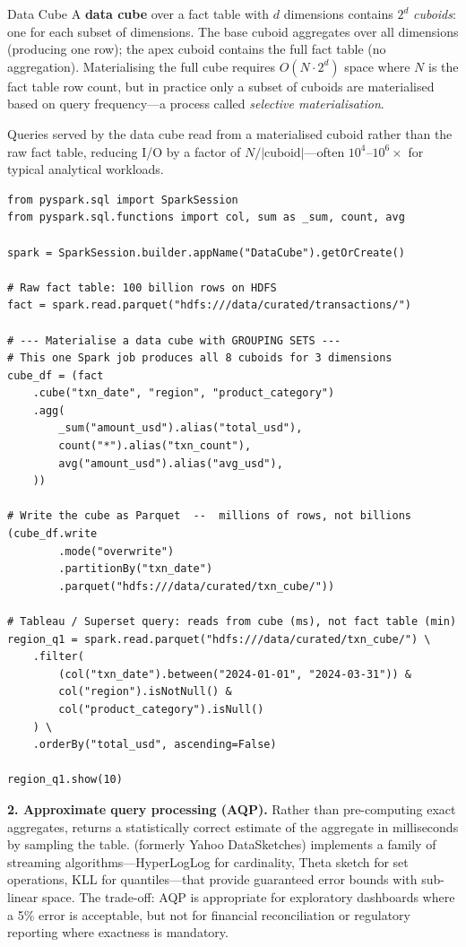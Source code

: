 \begin{defbox}{Data Cube}
A \textbf{data cube} over a fact table with $d$ dimensions contains
$2^d$ \emph{cuboids}: one for each subset of dimensions. The base
cuboid aggregates over all dimensions (producing one row); the apex
cuboid contains the full fact table (no aggregation). Materialising
the full cube requires $O(N \cdot 2^d)$ space where $N$ is the fact
table row count, but in practice only a subset of cuboids are
materialised based on query frequency---a process called
\emph{selective materialisation}.

Queries served by the data cube read from a materialised cuboid
rather than the raw fact table, reducing I/O by a factor of
$N / |\text{cuboid}|$---often $10^4$--$10^6 \times$ for typical
analytical workloads.
\end{defbox}

\begin{lstlisting}[style=pyspark, caption={Pre-aggregating a data cube in Spark SQL}]
from pyspark.sql import SparkSession
from pyspark.sql.functions import col, sum as _sum, count, avg

spark = SparkSession.builder.appName("DataCube").getOrCreate()

# Raw fact table: 100 billion rows on HDFS
fact = spark.read.parquet("hdfs:///data/curated/transactions/")

# --- Materialise a data cube with GROUPING SETS ---
# This one Spark job produces all 8 cuboids for 3 dimensions
cube_df = (fact
    .cube("txn_date", "region", "product_category")
    .agg(
        _sum("amount_usd").alias("total_usd"),
        count("*").alias("txn_count"),
        avg("amount_usd").alias("avg_usd"),
    ))

# Write the cube as Parquet  --  millions of rows, not billions
(cube_df.write
        .mode("overwrite")
        .partitionBy("txn_date")
        .parquet("hdfs:///data/curated/txn_cube/"))

# Tableau / Superset query: reads from cube (ms), not fact table (min)
region_q1 = spark.read.parquet("hdfs:///data/curated/txn_cube/") \
    .filter(
        (col("txn_date").between("2024-01-01", "2024-03-31")) &
        col("region").isNotNull() &
        col("product_category").isNull()
    ) \
    .orderBy("total_usd", ascending=False)

region_q1.show(10)
\end{lstlisting}

\textbf{2. Approximate query processing (AQP).} Rather than pre-computing
exact aggregates,  returns a statistically
correct estimate of the aggregate in milliseconds by sampling the table.
\tool{Apache DataSketches} (formerly Yahoo DataSketches) implements a
family of streaming algorithms---HyperLogLog for cardinality, Theta
sketch for set operations, KLL for quantiles---that provide guaranteed
error bounds with sub-linear space. The trade-off: AQP is appropriate
for exploratory dashboards where a 5\% error is acceptable, but not for
financial reconciliation or regulatory reporting where exactness is
mandatory.

